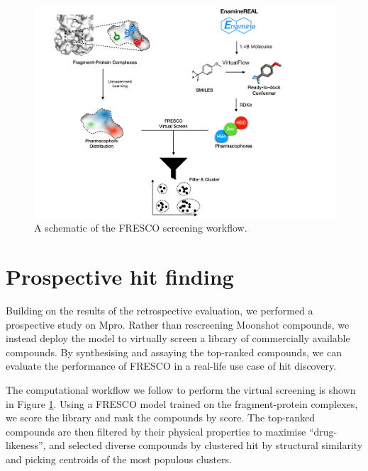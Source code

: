 \begin{figure}[!h]
    \centering
    \includegraphics[width=\linewidth]{Chapters/Fresco/Figs/flowchart_screening.pdf}
    \caption{A schematic of the FRESCO screening workflow.}
    \label{fig:screening_workflow}
\end{figure}

\section{Prospective hit finding} \label{sec:prospective}

Building on the results of the retrospective evaluation, we performed a prospective study on Mpro. Rather than rescreening Moonshot compounds, we instead deploy the model to virtually screen a library of commercially available compounds. By synthesising and assaying the top-ranked compounds, we can evaluate the performance of FRESCO in a real-life use case of hit discovery.

The computational workflow we follow to perform the virtual screening is shown in Figure \ref{fig:screening_workflow}. Using a FRESCO model trained on the fragment-protein complexes, we score the library and rank the compounds by score. The top-ranked compounds are then filtered by their physical properties to maximise ``drug-likeness'', and selected diverse compounds by clustered hit by structural similarity and picking centroids of the most populous clusters.


